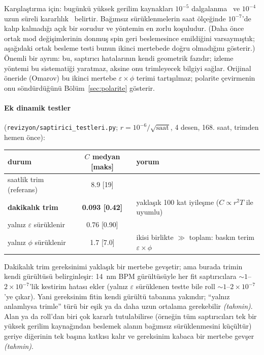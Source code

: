 \documentclass[11pt,a4paper]{article}
\newcommand{\tahmin}{\textit{(tahmin)}}
\begin{document}
Karşılaştırma için: bugünkü yüksek gerilim kaynakları $10^{-5}$ dalgalanma~\cite{cpedm_feas} ve $10^{-4}$ uzun
süreli kararlılık~\cite{fug} belirtir. Bağımsız sürüklenmelerin saat ölçeğinde $10^{-7}$'de kalıp kalmadığı
açık bir sorudur ve yöntemin en zorlu koşuludur. (Daha önce ortak mod değişimlerinin donmuş spin geri beslemesince
emildiğini varsaymıştık; aşağıdaki ortak besleme testi bunun ikinci mertebede doğru olmadığını gösterir.) Önemli bir ayrım: bu, saptırıcı hatalarının kendi geometrik
fazıdır; izleme yöntemi bu sistematiği yaratmaz, aksine onu trimleyecek bilgiyi sağlar. Orijinal öneride
(Omarov) bu ikinci mertebe $\varepsilon\times\phi$ terimi tartışılmaz; polarite çevirmenin onu söndürdüğünü
Bölüm~\ref{sec:polarite} gösterir.

\paragraph{Ek dinamik testler} (\texttt{revizyon/saptirici\_testleri.py}; $r=10^{-6}/\sqrt{\text{saat}}$, 4 desen,
168. saat, trimden hemen önce):
\begin{center}\footnotesize
\begin{tabular}{lcl}\toprule
durum & $C$ medyan [maks] & yorum\\\midrule
saatlik trim (referans) & 8.9 [19] & \\
\textbf{dakikalık trim} & \textbf{0.093 [0.42]} & yaklaşık 100 kat iyileşme ($C\propto r^2T$ ile uyumlu)\\
yalnız $\varepsilon$ sürüklenir & 0.76 [0.90] & \\
yalnız $\phi$ sürüklenir & 1.7 [7.0] & ikisi birlikte $\gg$ toplam: baskın terim $\varepsilon\times\phi$\\\bottomrule
\end{tabular}\end{center}
Dakikalık trim gereksinimi yaklaşık bir mertebe gevşetir; ama burada trimin kendi gürültüsü belirginleşir:
14~nm BPM gürültüsüyle her fit saptırıcılara $\sim1$--$2\times10^{-7}$'lik kestirim hatası ekler (yalnız
$\varepsilon$ sürüklenen testte bile roll $\sim1$--$2\times10^{-7}$'ye çıkar). Yani gereksinim fitin kendi
gürültü tabanına yakındır; ``yalnız anlamlıysa trimle'' türü bir eşik ya da daha uzun ortalama gerekebilir
\tahmin. Alan ya da roll'dan biri çok kararlı tutulabilirse (örneğin tüm saptırıcıları tek bir yüksek gerilim
kaynağından beslemek alanın bağımsız sürüklenmesini küçültür) geriye diğerinin tek başına katkısı kalır ve
gereksinim kabaca bir mertebe gevşer \tahmin.
\end{document}
